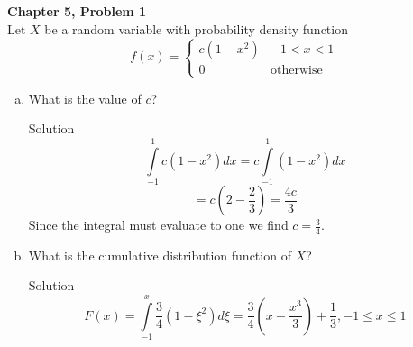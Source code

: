 \documentclass{article}
\begin{document}
\begin{spacing}{1.1}
\maketitle

\newpage
\begin{homeworkProblem}
  {\bf Chapter 5, Problem 1}\\
  Let $X$ be a random variable with probability density function 
  \[f(x) =
      \left\{
        \begin{array}{lr}
          c(1 - x^2) & -1 < x < 1 \\ 
          0 & \text{otherwise}
        \end{array}
      \right.\]
  \begin{enumerate}[(a)]
    \item  What is the value of $c$?
      \begin{homeworkSection}{Solution}
        \[\int\limits_{-1}^{1}{ c (1 - x^2) dx} = c \int\limits_{-1}^{1}{ (1 - x^2) dx}\]
        \[= c \left(2 - \frac{ 2}{ 3}\right) = \frac{ 4 c}{ 3}\]
        Since the integral must evaluate to one we find $c = \frac{ 3}{ 4}$.
      \end{homeworkSection}
    \item What is the cumulative distribution function of $X$?
      \begin{homeworkSection}{Solution}
        \[F( x) = \int\limits_{-1}^{ x} \frac{ 3}{ 4} (1 - \xi^2) d \xi
          = \frac{ 3}{ 4} \left(x - \frac{ x^3}{ 3}\right) + \frac{ 1}{ 3}, -1 \le x \le 1\]
      \end{homeworkSection}
  \end{enumerate}
\end{homeworkProblem}


\end{spacing}
\end{document}
